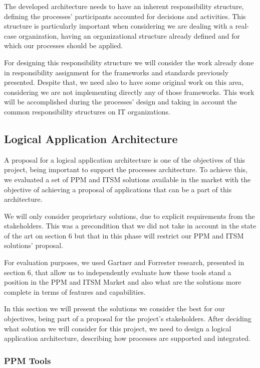 The developed architecture needs to have an inherent responsibility structure, defining the processes' participants accounted for decisions and activities. This structure is particularly important when considering we are dealing with a real-case organization, having an organizational structure already defined and for which our processes should be applied.\par
For designing this responsibility structure we will consider the work already done in responsibility assignment for the frameworks and standards previously presented. Despite that, we need also to have some original work on this area, considering we are not implementing directly any of those frameworks. This work will be accomplished during the processes' design and taking in account the common responsibility structures on IT organizations.\par 

\subsection{Logical Application Architecture}

A proposal for a logical application architecture is one of the objectives of this project, being important to support the processes architecture. To achieve this, we evaluated a set of PPM and ITSM solutions available in the market with the objective of achieving a proposal of applications that can be a part of this architecture.\par
We will only consider proprietary solutions, due to explicit requirements from the stakeholders. This was a precondition that we did not take in account in the state of the art on section 6 but that in this phase will restrict our PPM and ITSM solutions' proposal.\par 
For evaluation purposes, we used Gartner and Forrester research, presented in section 6, that allow us to independently evaluate how these tools stand a position in the PPM and ITSM Market and also what are the solutions more complete in terms of features and capabilities.\par
In this section we will present the solutions we consider the best for our objectives, being part of a proposal for the project's stakeholders. After deciding what solution we will consider for this project, we need to design a logical application architecture, describing how processes are supported and integrated.\par

\subsubsection{PPM Tools}

